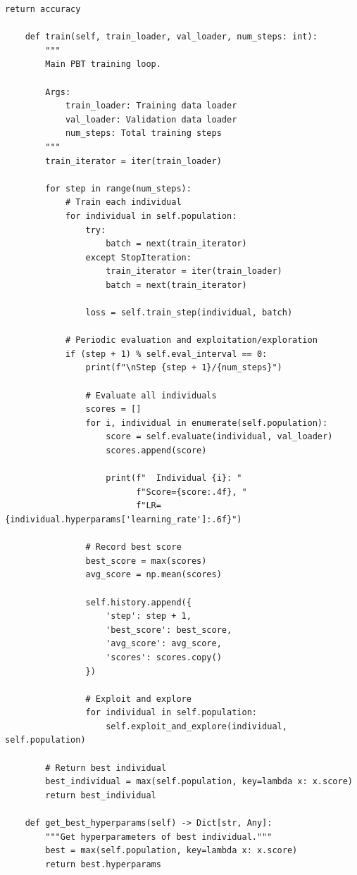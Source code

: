 \begin{lstlisting}[style=python, caption=Population-based training implementation]
        return accuracy

    def train(self, train_loader, val_loader, num_steps: int):
        """
        Main PBT training loop.

        Args:
            train_loader: Training data loader
            val_loader: Validation data loader
            num_steps: Total training steps
        """
        train_iterator = iter(train_loader)

        for step in range(num_steps):
            # Train each individual
            for individual in self.population:
                try:
                    batch = next(train_iterator)
                except StopIteration:
                    train_iterator = iter(train_loader)
                    batch = next(train_iterator)

                loss = self.train_step(individual, batch)

            # Periodic evaluation and exploitation/exploration
            if (step + 1) % self.eval_interval == 0:
                print(f"\nStep {step + 1}/{num_steps}")

                # Evaluate all individuals
                scores = []
                for i, individual in enumerate(self.population):
                    score = self.evaluate(individual, val_loader)
                    scores.append(score)

                    print(f"  Individual {i}: "
                          f"Score={score:.4f}, "
                          f"LR={individual.hyperparams['learning_rate']:.6f}")

                # Record best score
                best_score = max(scores)
                avg_score = np.mean(scores)

                self.history.append({
                    'step': step + 1,
                    'best_score': best_score,
                    'avg_score': avg_score,
                    'scores': scores.copy()
                })

                # Exploit and explore
                for individual in self.population:
                    self.exploit_and_explore(individual, self.population)

        # Return best individual
        best_individual = max(self.population, key=lambda x: x.score)
        return best_individual

    def get_best_hyperparams(self) -> Dict[str, Any]:
        """Get hyperparameters of best individual."""
        best = max(self.population, key=lambda x: x.score)
        return best.hyperparams


\end{lstlisting}
